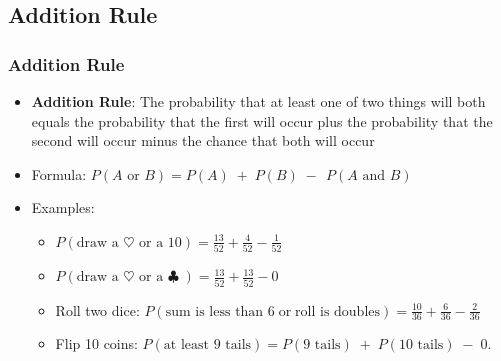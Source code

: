 \documentclass[t]{beamer}
\begin{document}
\subsection{Addition Rule}
\begin{frame}
\frametitle{Addition Rule}
{\small
\begin{itemize}
\item \textbf{Addition Rule}:  The probability that at least one of two 
things will both  equals the probability that the first
will occur plus the probability that the second will occur minus the chance that both will occur
\item Formula:  $P(\mbox{$A$ or $B$}) = P(A) \; + \; P(B) \; - \; \,P(\mbox{$A$ and $B$})$
\item Examples:
   \begin{itemize}
   \item \footnotesize $P(\mbox{draw a $\heartsuit$ or a 10}) = \frac{13}{52} + \frac{4}{52} - \frac{1}{52}$\\[5pt]
   \item \footnotesize $P(\mbox{draw a $\heartsuit$ or a $\clubsuit$}\;) = \frac{13}{52} + \frac{13}{52} - 0$\\[5pt]
   \item \footnotesize Roll two dice:  $P(\mbox{sum is less than 6}\; \mbox{or}\; \mbox{roll is doubles}) = 
           \frac{10}{36} + \frac{6}{36} - \frac{2}{36}$\\[5pt]
   \item \footnotesize Flip 10 coins:  $P(\mbox{at least 9 tails}) = P(\mbox{9 tails}) \; + \; P(\mbox{10 tails}) \; - \; 0$.  
   \end{itemize}
\end{itemize}}

\end{frame}
\end{document}
